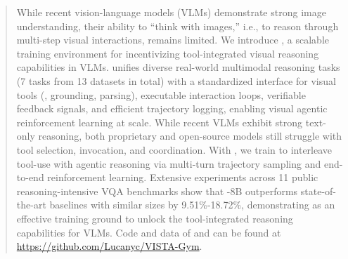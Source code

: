 \begin{abstract}
While recent vision-language models (VLMs) demonstrate strong image understanding, their ability to ``think with images,'' i.e., to reason through multi-step visual interactions, remains limited. 
We introduce \env{}, a scalable training environment for incentivizing tool-integrated visual reasoning capabilities in VLMs. 
\env{} unifies diverse real-world multimodal reasoning tasks (7 tasks from 13 datasets in total) with a standardized interface for visual tools (\eg, grounding, parsing), executable interaction loops, verifiable feedback signals, and efficient trajectory logging, enabling visual agentic reinforcement learning at scale.
While recent VLMs exhibit strong text-only reasoning, both proprietary and open-source models still struggle with tool selection, invocation, and coordination. 
With \env{}, we train \ours{} to interleave tool-use with agentic reasoning via multi-turn trajectory sampling and end-to-end reinforcement learning. 
Extensive experiments across 11 public reasoning-intensive VQA benchmarks show that \ours{}-8B outperforms state-of-the-art baselines with similar sizes by 9.51\%-18.72\%, demonstrating \env{} as an effective training ground to unlock the tool-integrated reasoning capabilities for VLMs.
Code and data of \env{} and \ours{} can be found at \url{https://github.com/Lucanyc/VISTA-Gym}.
\end{abstract}